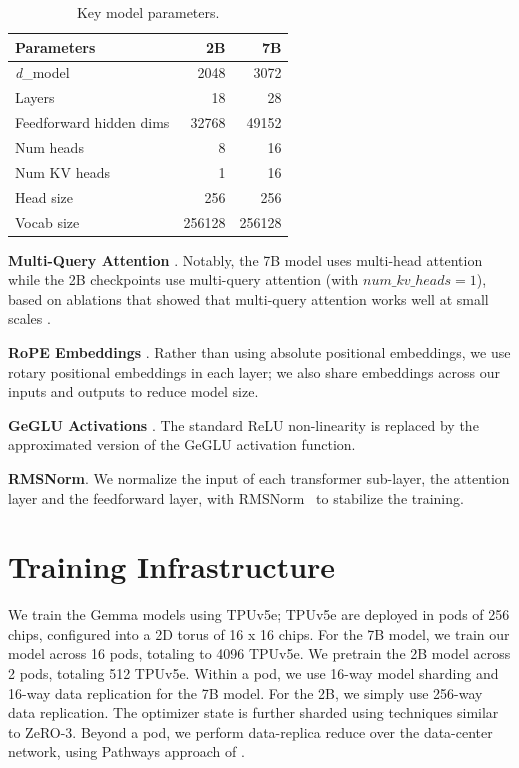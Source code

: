 \documentclass[11pt, a4paper, logo, twocolumn, copyright, nonumbering]{googledeepmind}
\begin{document}
\begin{table}
    \centering
    \begin{tabular}{l r r}
    \toprule
        Parameters & \textbf{2B} & \textbf{7B} \\
        \midrule
        \textit{d}\_{model} & 2048 & 3072 \\
        Layers & 18 & 28 \\
        Feedforward hidden dims & 32768 & 49152 \\
        Num heads & 8 & 16 \\
        Num KV heads & 1 & 16 \\
        Head size & 256 & 256 \\
        Vocab size & 256128 & 256128 \\
    \bottomrule
    \end{tabular}
    \caption{Key model parameters.}
    \label{tab:model_params}
\end{table}

\noindent\textbf{Multi-Query Attention} \citep{mqa}. 
Notably, the 7B model uses multi-head attention while the 2B checkpoints use multi-query attention (with $num\_kv\_heads = 1$), based on ablations that showed that multi-query attention works well at small scales \citep{mqa}. 

\noindent\textbf{RoPE Embeddings} \citep{rope}. Rather than using absolute positional embeddings, we use rotary positional embeddings in each layer; we also share embeddings across our inputs and outputs to reduce model size.

\noindent\textbf{GeGLU Activations} \citep{geglu}. The standard ReLU non-linearity is replaced by the approximated version of the GeGLU activation function.

\noindent\textbf{RMSNorm}. We normalize the input of each transformer sub-layer, the attention layer and the feedforward layer, with RMSNorm~\citep{rmsnorm} to stabilize the training.

\section{Training Infrastructure}

We train the Gemma models using TPUv5e; TPUv5e are deployed in pods of 256 chips, configured into a 2D torus of 16 x 16 chips. For the 7B model, we train our model across 16 pods, totaling to 4096 TPUv5e. 
We pretrain the 2B model across 2 pods, totaling 512 TPUv5e. 
Within a pod, we use 16-way model sharding and 16-way data replication for the 7B model. 
For the 2B, we simply use 256-way data replication. 
The optimizer state is further sharded using techniques similar to ZeRO-3. 
Beyond a pod, we perform data-replica reduce over the data-center network, using Pathways approach of \citep{barham2022pathways}.
\end{document}
